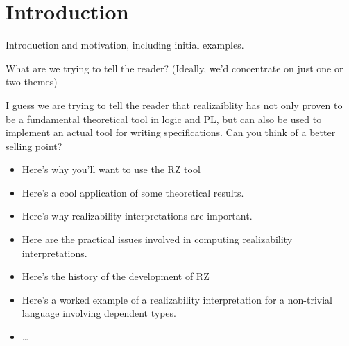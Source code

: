 \section{Introduction}
\label{sec:introduction}

Introduction and motivation, including initial examples.

What are we trying to tell the reader?  (Ideally, we'd concentrate on just one or two themes)

I guess we are trying to tell the reader that realizaiblity has not
only proven to be a fundamental theoretical tool in logic and PL, but
can also be used to implement an actual tool for writing
specifications. Can you think of a better selling point?

\begin{itemize}
\item Here's why you'll want to use the RZ tool
\item Here's a cool application of some theoretical results.
\item Here's why realizability interpretations
  are important.
\item Here are the practical issues involved in computing realizability
  interpretations.
\item Here's the history of the development of RZ
\item Here's a worked example of a realizability interpretation for a non-trivial language involving dependent types.
\item \ldots
\end{itemize}




